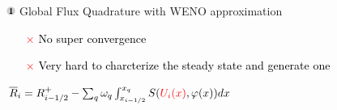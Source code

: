\begin{frame}[t]{\includegraphics[width=0.3cm]{circle1} Global Flux Quadrature  with WENO approximation}
{\begin{enumerate}
\item[\textcolor{red}{\Large$\times$}]  \textcolor{black}{No super convergence} 

\vspace{0.2cm}

\item[\textcolor{red}{\Large$\times$}]  \textcolor{black}{Very hard to charcterize the steady state and generate one }
\end{enumerate}

\begin{flushright}
$ \overline{R}_i =R_{i-1/2}^+ - \sum_q \omega_q  \int_{x_{i-1/2}}^{x_q} S({\color{red}U_i(x)},\varphi(x)) dx$
\end{flushright}
}




\end{frame}
 
